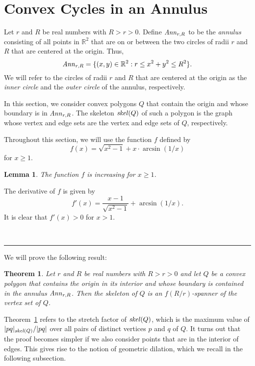 \documentclass[12pt]{article}
\newtheorem{theorem}{Theorem}
\newtheorem{lemma}{Lemma}
\newcommand{\IR}{\mathbb{R}}
\newcommand{\skel}{\mathord{\it skel}}
\newcommand{\Ann}{\mathord{\it Ann}}
\newcommand{\qed}{\rule{0.5em}{1.5ex}}
\newcommand{\fqed}{{\hfill~\qed}}
\newenvironment{proof}{{\noindent \bf Proof.}}
                      {{\hfill \fqed} \vspace{1em}}
\begin{document}
\section{Convex Cycles in an Annulus}  \label{secannulus} 
Let $r$ and $R$ be real numbers with $R>r>0$. Define $\Ann_{r,R}$ to be 
the \emph{annulus} consisting of all points in $\IR^2$ that are on or 
between the two circles of radii $r$ and $R$ that are centered at the 
origin. Thus,  
\[ \Ann_{r,R} = \{ (x,y) \in \IR^2 : r \leq x^2 + y^2 \leq R^2 \} . 
\]  
We will refer to the circles of radii $r$ and $R$ that are centered at 
the origin as the \emph{inner circle} and the \emph{outer circle} of the 
annulus, respectively. 

In this section, we consider convex polygons $Q$ that contain the origin 
and whose boundary is in $\Ann_{r,R}$. The skeleton $\skel(Q)$ of such 
a polygon is the graph whose vertex and edge sets are the vertex 
and edge sets of $Q$, respectively. 

Throughout this section, we will use the function $f$ defined by 
\[ f(x) = \sqrt{x^2-1} + x \cdot \arcsin(1/x)   
\]
for $x \geq 1$.  

\begin{lemma}    \label{lemfincr}
The function $f$ is increasing for $x \geq 1$. 
\end{lemma} 
\begin{proof}
The derivative of $f$ is given by 
\[ f'(x) = \frac{x-1}{\sqrt{x^2-1}} + \arcsin(1/x) . 
\] 
It is clear that $f'(x)>0$ for $x>1$. 
\end{proof}  

We will prove the following result:  
 
\begin{theorem}    \label{thmpolygon}  
Let $r$ and $R$ be real numbers with $R>r>0$ and let $Q$ be a convex 
polygon that contains the origin in its interior and whose boundary is 
contained in the annulus $\Ann_{r,R}$. Then the skeleton of $Q$ is an 
$f(R/r)$-spanner of the vertex set of $Q$. 
\end{theorem} 

Theorem~\ref{thmpolygon} refers to the stretch factor of $\skel(Q)$, 
which is the maximum value of $|pq|_{\skel(Q)} / |pq|$ over all
pairs of distinct vertices $p$ and $q$ of $Q$. It turns out that the 
proof becomes simpler if we also consider points that are in the interior 
of edges. This gives rise to the notion of geometric dilation, which 
we recall in the following subsection.    
\end{document}
